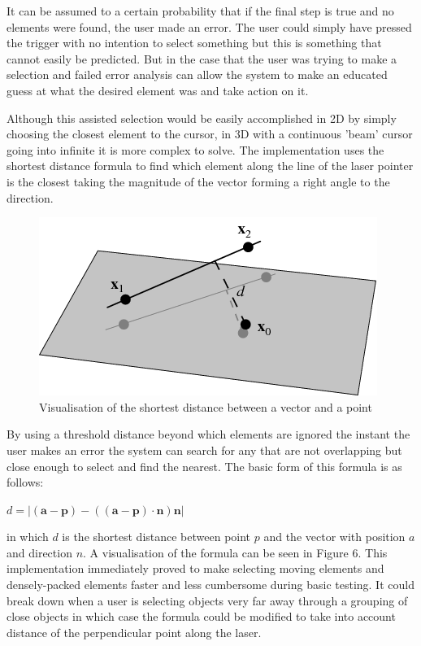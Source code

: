 \documentclass[12pt]{article}
\begin{document}
It can be assumed to a certain probability that if the final step is true and no elements were found, the user made an error. The user could simply have pressed the trigger with no intention to select something but this is something that cannot easily be predicted. But in the case that the user was trying to make a selection and failed error analysis can allow the system to make an educated guess at what the desired element was and take action on it. 

Although this assisted selection would be easily accomplished in 2D by simply choosing the closest element to the cursor, in 3D with a continuous 'beam' cursor going into infinite it is more complex to solve. The implementation uses the shortest distance formula to find which element along the line of the laser pointer is the closest taking the magnitude of the vector forming a right angle to the direction.

\begin{figure}
\centering
  \includegraphics[width=.8\linewidth]{nearestpoint.png}
  \caption{Visualisation of the shortest distance between a vector and a point}
\end{figure}

By using a threshold distance beyond which elements are ignored the instant the user makes an error the system can search for any that are not overlapping but close enough to select and find the nearest. The basic form of this formula is as follows: 

$d = |(\mathbf{a}-\mathbf{p}) - ((\mathbf{a}-\mathbf{p}) \cdot  \mathbf{n})\mathbf{n}|$

in which $d$ is the shortest distance between point $p$ and the vector with position $a$ and direction $n$. A visualisation of the formula can be seen in Figure 6. This implementation immediately proved to make selecting moving elements and densely-packed elements faster and less cumbersome during basic testing. It could break down when a user is selecting objects very far away through a grouping of close objects in which case the formula could be modified to take into account distance of the perpendicular point along the laser.
\end{document}
